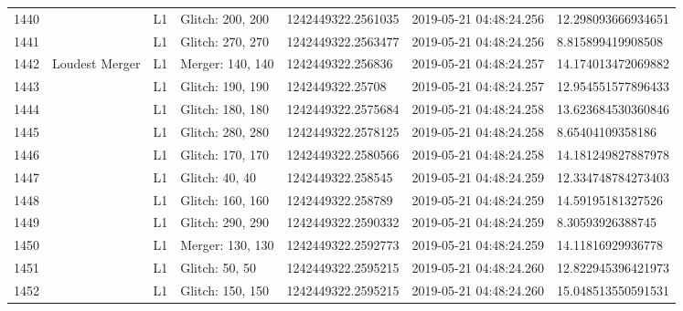 \begin{longtable}{lllllll}
1440 &                                                    &       L1 &  Glitch: 200, 200 &  1242449322.2561035 &  2019-05-21 04:48:24.256 &  12.298093666934651 \\
1441 &                                                    &       L1 &  Glitch: 270, 270 &  1242449322.2563477 &  2019-05-21 04:48:24.256 &   8.815899419908508 \\
1442 &                                     Loudest Merger &       L1 &  Merger: 140, 140 &   1242449322.256836 &  2019-05-21 04:48:24.257 &  14.174013472069882 \\
1443 &                                                    &       L1 &  Glitch: 190, 190 &    1242449322.25708 &  2019-05-21 04:48:24.257 &  12.954551577896433 \\
1444 &                                                    &       L1 &  Glitch: 180, 180 &  1242449322.2575684 &  2019-05-21 04:48:24.258 &  13.623684530360846 \\
1445 &                                                    &       L1 &  Glitch: 280, 280 &  1242449322.2578125 &  2019-05-21 04:48:24.258 &    8.65404109358186 \\
1446 &                                                    &       L1 &  Glitch: 170, 170 &  1242449322.2580566 &  2019-05-21 04:48:24.258 &  14.181249827887978 \\
1447 &                                                    &       L1 &    Glitch: 40, 40 &   1242449322.258545 &  2019-05-21 04:48:24.259 &  12.334748784273403 \\
1448 &                                                    &       L1 &  Glitch: 160, 160 &   1242449322.258789 &  2019-05-21 04:48:24.259 &   14.59195181327526 \\
1449 &                                                    &       L1 &  Glitch: 290, 290 &  1242449322.2590332 &  2019-05-21 04:48:24.259 &    8.30593926388745 \\
1450 &                                                    &       L1 &  Merger: 130, 130 &  1242449322.2592773 &  2019-05-21 04:48:24.259 &   14.11816929936778 \\
1451 &                                                    &       L1 &    Glitch: 50, 50 &  1242449322.2595215 &  2019-05-21 04:48:24.260 &  12.822945396421973 \\
1452 &                                                    &       L1 &  Glitch: 150, 150 &  1242449322.2595215 &  2019-05-21 04:48:24.260 &  15.048513550591531 \\

\end{longtable}
